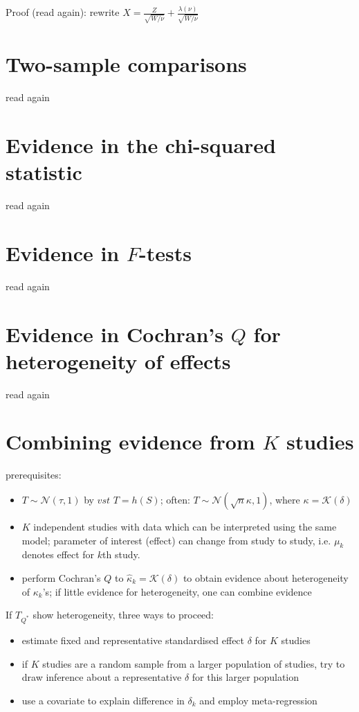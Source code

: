 Proof (read again): rewrite $X = \frac{Z}{\sqrt{W/\nu}}+\frac{\lambda(\nu)}{\sqrt{W/\nu}}$

\section{Two-sample comparisons}
read again

\section{Evidence in the chi-squared statistic}
read again

\section{Evidence in $F$-tests}
read again

\section{Evidence in Cochran's $Q$ for heterogeneity of effects}
read again

\section{Combining evidence from $K$ studies}
prerequisites:
\begin{itemize}
    \item $T \sim \mathcal{N}(\tau,1)$ by $vst$ $T = h(S)$; often: $T \sim  \mathcal{N}(\sqrt{n}\kappa,1)$, where $\kappa = \mathcal{K}(\delta)$
    \item $K$ independent studies with data which can be interpreted using the same model; parameter of interest (effect) can change from study to study, i.e. $\mu_k$ denotes effect for $k$th study.
    \item perform Cochran's $Q$ to $\hat{\kappa}_k = \mathcal{K}(\delta)$ to obtain evidence about heterogeneity of $\kappa_k$'s; if little evidence for heterogeneity, one can combine evidence
\end{itemize}

If $T_{Q^*}$ show heterogeneity, three ways to proceed:
\begin{itemize}
    \item estimate fixed and representative standardised effect $\delta$ for $K$ studies
    \item if $K$ studies are a random sample from a larger population of studies, try to draw inference about a representative $\delta$ for this larger population
    \item use a covariate to explain difference in $\delta_k$ and employ meta-regression
\end{itemize}

